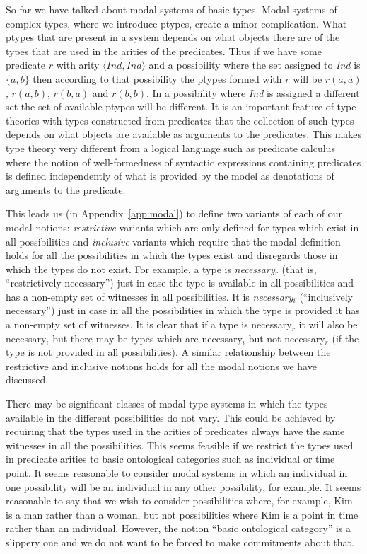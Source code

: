 So far we have talked about modal systems of basic types.  Modal
systems of complex types, where we introduce ptypes, create a
minor complication.  What ptypes that are present in a system depends
on what objects there are of the types that are used in the arities of
the predicates.  Thus if we have some predicate $r$ with arity
$\langle\textit{Ind},\textit{Ind}\rangle$ and a possibility where the
set assigned to \textit{Ind} is $\{a,b\}$ then according to that
possibility the ptypes formed with $r$ will be $r(a,a)$, $r(a,b)$,
$r(b,a)$ and $r(b,b)$.  In a possibility where \textit{Ind} is
assigned a different set the set of available ptypes will be
different.  It is an important feature of type theories with types
constructed from predicates that the collection of such types depends
on what objects are available as arguments to the predicates.  This
makes type theory very different from a logical language such as
predicate calculus where the notion of well-formedness of syntactic
expressions containing predicates is defined independently of what is
provided by the model as denotations of arguments to the predicate.

This leads us (in Appendix~\ref{app:modal}) to define two variants of
each of our modal notions: \textit{restrictive} variants which are only defined
for types which exist in all possibilities and \textit{inclusive}
variants which require that the modal definition holds for all the
possibilities in which the types exist and disregards those in which
the types do not exist.  For example, a type is \textit{necessary}$_r$
(that is, ``restrictively necessary'') just in case the type is
available in all possibilities and has a non-empty set of witnesses in
all possibilities.  It is \textit{necessary}$_i$ (``inclusively
necessary'') just in case in all the possibilities in which the type
is provided it has a non-empty set of witnesses.  It is clear that if
a type is necessary$_r$ it will also be necessary$_i$ but there may be
types which are necessary$_i$ but not necessary$_r$ (if the type is
not provided in all possibilities).  A similar relationship between
the restrictive and inclusive notions holds for all the modal notions
we have discussed.

There may be significant classes of modal type systems in which the
types available in the different possibilities do not vary.  This
could be achieved by requiring that the types used in the arities of
predicates always have the same witnesses in all the possibilities.
This seems feasible if we restrict the types used in predicate arities
to basic ontological categories such as individual or time point.  It
seems reasonable to consider modal systems in which an individual in
one possibility will be an individual in any other possibility, for
example.  It seems reasonable to say that we wish to consider
possibilities where, for example, Kim is a man rather than a woman,
but not possibilities where Kim is a point in time rather than an
individual.  However, the notion ``basic ontological category'' is a
slippery one and we do not want to be forced to make commitments about that.

